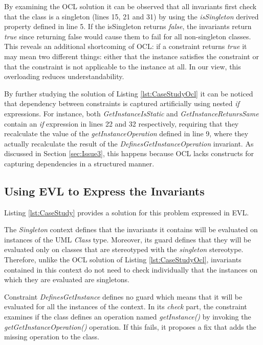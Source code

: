 

By examining the OCL solution it can be observed that all invariants first check that the class is a singleton (lines 15, 21 and 31) by using the \emph{isSingleton} derived property defined in line 5. If the isSingleton returns \emph{false}, the invariants return \emph{true} since returning false would cause them to fail for all non-singleton classes. This reveals an additional shortcoming of OCL: if a constraint returns \emph{true} it may mean two different things: either that the instance satisfies the constraint or that the constraint is not applicable to the instance at all. In our view, this overloading reduces understandability.

By further studying the solution of Listing \ref{lst:CaseStudyOcl} it can be noticed that dependency between constraints is captured artificially using nested \emph{if} expressions. For instance, both \emph{GetInstanceIsStatic} and \emph{GetInstanceRetunrsSame} contain an \emph{if} expression in lines 22 and 32 respectively, requiring that they recalculate the value of the \emph{getInstanceOperation} defined in line 9, where they actually recalculate the result of the \emph{DefinesGetInstanceOperation} invariant. As discussed in Section \ref{sec:Issue3}, this happens because OCL lacks constructs for capturing dependencies in a structured manner.

\subsection{Using EVL to Express the Invariants}

Listing \ref{lst:CaseStudy} provides a solution for this problem expressed in EVL.



The \emph{Singleton} context defines that the invariants it contains will be evaluated on instances of the UML \emph{Class} type. Moreover, its guard defines that they will be evaluated only on classes that are stereotyped with the \emph{singleton} stereotype. Therefore, unlike the OCL solution of Listing \ref{lst:CaseStudyOcl}, invariants contained in this context do not need to check individually that the instances on which they are evaluated are singletons.

Constraint \emph{DefinesGetInstance} defines no guard which means that it will be evaluated for all the instances of the context. In its \emph{check} part, the constraint examines if the class defines an operation named \emph{getInstance()} by invoking the \emph{getGetInstanceOperation()} operation. If this fails, it proposes a fix that adds the missing operation to the class.

